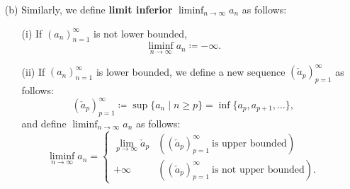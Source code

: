 \begin{frame}[fragile]
  \begin{defi}
    \begin{enumerate}
      \item[(b)] Similarly, we define {\bf limit inferior} $\displaystyle\liminf_{n\to\infty}a_n$ as follows:
      \begin{enumerate}
        \item[(i)] If $(a_n)_{n=1}^\infty$ is not lower bounded,
        \[
          \displaystyle\liminf_{n\to\infty}a_n\coloneqq -\infty.
        \]
        \item[(ii)] If $(a_n)_{n=1}^\infty$ is lower bounded, we define a new sequence $(\check{a}_p)_{p=1}^\infty$ as follows:
        \[
          (\check{a}_p)_{p=1}^\infty\coloneqq\sup\{a_n\mid n\geq p\} = \inf\{a_p,a_{p+1},\ldots\},
        \]
        and define $\displaystyle\liminf_{n\to\infty}a_n$ as follows:
        \[
          \displaystyle\liminf_{n\to\infty}a_n = \begin{cases}
            \displaystyle\lim_{p\to\infty}\check{a}_p & ((\check{a}_p)_{p=1}^\infty\ \mbox{is upper bounded})\\
            +\infty & ((\check{a}_p)_{p=1}^\infty\ \mbox{is not upper bounded}).
          \end{cases}
        \]
      \end{enumerate}
    \end{enumerate}
  \end{defi}
\end{frame}

